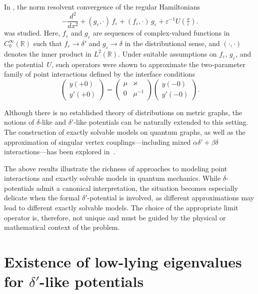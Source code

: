 \documentclass[reqno]{amsart}
\theoremstyle{definition}
\theoremstyle{remark}
\numberwithin{equation}{section}
\renewcommand{\kappa}{\varkappa}
\newcommand{\Real}{\mathbb R}
\newcommand{\eps}{\varepsilon}
\newcommand\xe{\left(\tfrac x\eps\right)}
\begin{document}
In \cite{GolovatyJPA2018, GolovatyIEOT2018}, the norm resolvent convergence of the regular Hamiltonians
\begin{equation*}
  -\frac{d^2}{dx^2}+(g_\eps,\cdot) \,f_\eps
  +(f_\eps,\cdot) \,g_\eps +\eps^{-1}U\xe.
\end{equation*}
was studied. Here, $f_\eps$ and $g_\eps$ are sequences of complex-valued functions in $C_0^\infty(\Real)$ such that $f_\eps \to \delta'$ and $g_\eps \to \delta$ in the distributional sense, and $(\cdot, \cdot)$ denotes the inner product in $L^2(\Real)$. Under suitable assumptions on $f_\eps$, $g_\eps$, and the potential~$U$, such operators were shown to approximate the two-parameter family of point interactions defined by the interface conditions
\begin{equation*}
\begin{pmatrix}
  y(+0)\\ y'(+0)
\end{pmatrix}=
\begin{pmatrix}
  \mu & \kappa\\
  0 & \mu^{-1}
\end{pmatrix}
\begin{pmatrix}
  y(-0)\\ y'(-0)
\end{pmatrix}.
\end{equation*}

Although there is no established theory of distributions on metric graphs, the notions of $\delta$-like and $\delta'$-like potentials can be naturally extended to this setting. The construction of exactly solvable models on quantum graphs, as well as the approximation of singular vertex couplings---including mixed $\alpha\delta' + \beta\delta$ interactions---has been explored in~\cite{CheonExner2004, Manko2010, ExnerManko2013, GolovatyAHP2023}.

The above results illustrate the richness of approaches to modeling point interactions and exactly solvable models in quantum mechanics. While $\delta$-potentials admit a canonical interpretation, the situation becomes especially delicate when the formal $\delta'$-potential is involved, as different approximations may lead to different exactly solvable models. The choice of the appropriate limit operator is, therefore, not unique and must be guided by the physical or mathematical context of the problem.

%
\section{Existence of low-lying eigenvalues for $\delta'$-like potentials}\label{sec:existence}
%
\end{document}
